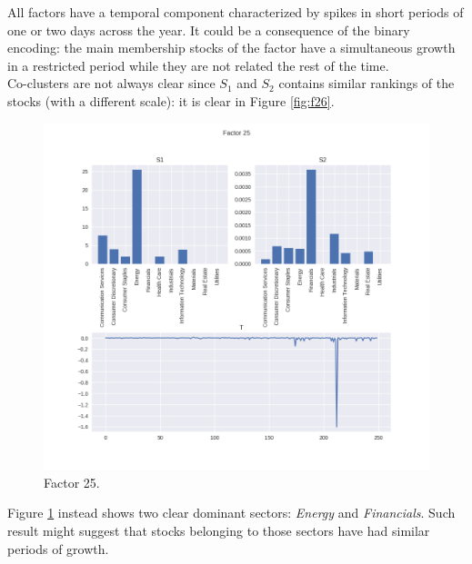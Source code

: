 \documentclass[12pt]{extarticle}
\begin{document}
All factors have a temporal component characterized by spikes in short periods of one or two days across the year. It could be a consequence of the binary encoding: the main membership stocks of the factor have a simultaneous growth in a restricted period while they are not related the rest of the time.\\
Co-clusters are not always clear since $S_1$ and $S_2$ contains similar rankings of the stocks (with a different scale): it is clear in Figure \ref{fig:f26}.

\begin{figure}[h]
	\centering
	\includegraphics[width=\textwidth]{factor_25.png}
	\caption{Factor 25.} 
	\label{fig:f25}
\end{figure}

Figure \ref{fig:f25} instead shows two clear dominant sectors: \textit{Energy} and \textit{Financials}. Such result might suggest that stocks belonging to those sectors have had similar periods of growth. 
\end{document}
